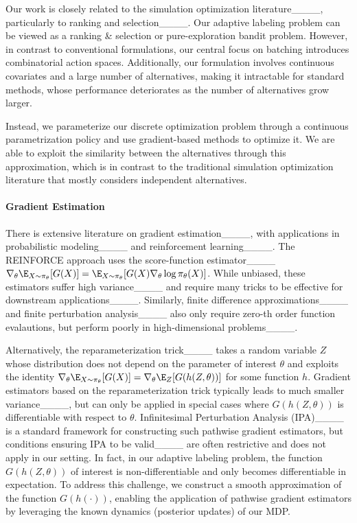 Our work is closely related to the  simulation optimization literature____,
 particularly to ranking and selection____.
Our adaptive labeling problem can be viewed as a ranking \& selection or pure-exploration bandit problem. However, in contrast to conventional formulations, our central focus on batching
introduces combinatorial action spaces.
Additionally, our formulation involves continuous covariates and a large number of alternatives,   making it  intractable for standard methods, whose performance deteriorates as the number of alternatives grow larger. 

Instead, we parameterize our discrete optimization problem through a continuous parametrization policy and use gradient-based methods to optimize it. We are able to exploit the similarity between the alternatives through this approximation, which is in contrast to the  traditional simulation optimization literature that mostly considers independent alternatives. 

\paragraph{Gradient Estimation} 

There is extensive literature on gradient estimation____, with applications in probabilistic modeling____ and reinforcement learning____. 
The \textsf{REINFORCE} approach uses the score-function estimator____
$\nabla_\theta \E_{X \sim \pi_\theta}[G(X)] = \E_{X \sim \pi_\theta}[G(X) \nabla_\theta\log \pi_\theta (X)]$. While unbiased, these estimators suffer high variance____ and require many tricks to be effective for downstream applications____.
Similarly, finite difference approximations____  and finite perturbation analysis____ also only require zero-th order function evalautions, but perform poorly in high-dimensional problems____.


Alternatively, the reparameterization trick____ 
takes a random variable $Z$ whose distribution does not depend on the parameter of interest $\theta$ and 
exploits the identity
$\nabla_\theta \E_{X \sim \pi_\theta}[G(X)]
= \nabla_\theta \E_{Z}[G(h(Z, \theta))]$ for some function $h$.
 Gradient estimators based on the reparameterization trick 
 typically leads to much smaller
variance____, 
but can only be applied in special cases where $G(h(Z, \theta))$ is differentiable with respect to $\theta$.  
Infinitesimal Perturbation Analysis (IPA)____ 
is a standard framework for constructing such pathwise gradient estimators, but conditions ensuring IPA to be valid____ 
are often restrictive  and does not apply in our setting. 
In fact, in our adaptive labeling problem, the function $G(h(Z, \theta))$ of interest
is non-differentiable and only becomes differentiable in expectation.
To address this challenge, we construct a smooth approximation of the function $G(h(\cdot))$, enabling the application of pathwise gradient estimators by leveraging the known dynamics (posterior updates) of our MDP.

